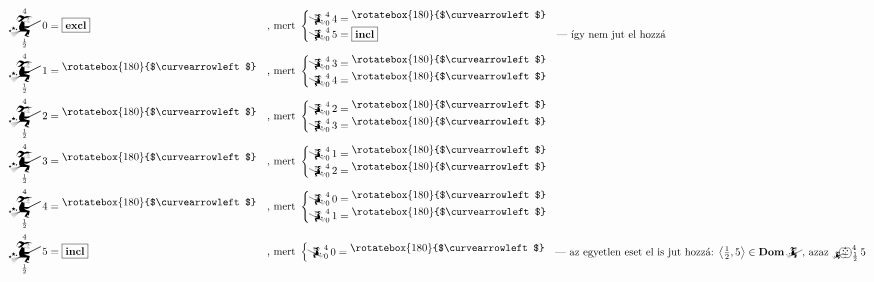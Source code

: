 \documentclass{article}
\newcommand{\nothing}{\text{\raisebox{0.4em}{\rotatebox{180}{$\curvearrowleft$}}}}%
\newcommand{\just}[1]{\boxed{#1}}%
\DeclareMathOperator{\dom}{\mathbf{Dom}}
\newcommand{\incl}{\mathbf{incl}}
\newcommand{\excl}{\mathbf{excl}}
\newcommand{\angled}[1]{\left\langle#1\right\rangle}
\newcommand{\mainfunA}[3]{\mathwitch_{#2}^{#1}#3}
\newcommand{\mainfunB}[3]{\reversemathwitch_{#2}^{#1}#3}
\newcommand{\yesmainfunA}[3]{{}_{\mathwitch}\!\!\!\!\bigpumpkin^{#1}_{#2}#3}
\newcommand{\currymainfunA}{\mathwitch}
\begin{document}
	\begin{align*}
		\mainfunA4{\frac12}0  &= \just \excl &&\text{, mert }\begin{cases}\mainfunB4{0}4 = \nothing\\\mainfunB4{0}5 = \just \incl&\text{--- így nem jut el hozzá}\end{cases} \\
		\mainfunA4{\frac12}1  &= \nothing    &&\text{, mert }\begin{cases}\mainfunB4{0}3 = \nothing\\\mainfunB4{0}4 = \nothing&\end{cases} \\
		\mainfunA4{\frac12}2  &= \nothing    &&\text{, mert }\begin{cases}\mainfunB4{0}2 = \nothing\\\mainfunB4{0}3 = \nothing&\end{cases} \\
		\mainfunA4{\frac12}3  &= \nothing    &&\text{, mert }\begin{cases}\mainfunB4{0}1 = \nothing\\\mainfunB4{0}2 = \nothing&\end{cases} \\
		\mainfunA4{\frac12}4  &= \nothing    &&\text{, mert }\begin{cases}\mainfunB4{0}0 = \nothing\\\mainfunB4{0}1 = \nothing&\end{cases} \\
		\mainfunA4{\frac12}5  &= \just \incl &&\text{, mert }\begin{cases}\mainfunB4{0}0 = \nothing&\text{--- az egyetlen eset el is jut hozzá: $\angled{\frac12,5}\in\dom\currymainfunA$, azaz $\yesmainfunA4{\frac12}5$}\end{cases}
	\end{align*}
\end{document}
